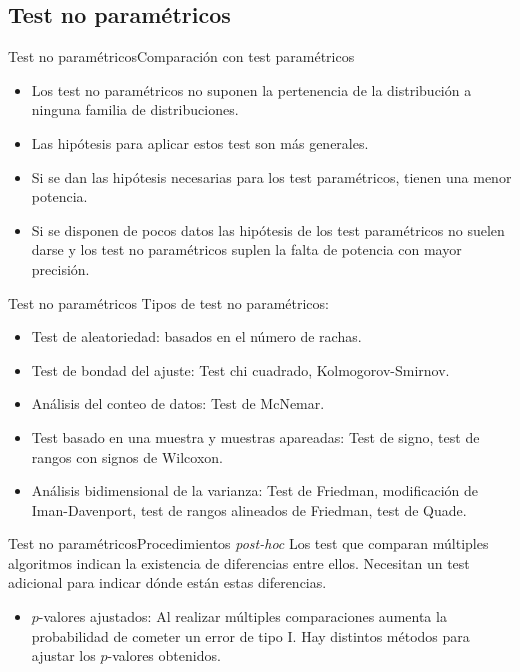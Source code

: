 \documentclass[leqno]{beamer}
\theoremstyle{definition_wo_parentheses}
\begin{document}
\subsection{Test no paramétricos}

\begin{frame}{Test no paramétricos}{Comparación con test paramétricos}
\begin{itemize}
\item Los test no paramétricos no suponen la pertenencia 
	de la distribución a ninguna familia de distribuciones.
\item Las hipótesis para aplicar estos test son más
	generales. 
\item Si se dan las hipótesis necesarias para los test
	paramétricos, tienen una menor potencia.
\item Si se disponen de pocos datos las hipótesis de los
	test paramétricos no suelen darse y los test no
	paramétricos suplen la falta de potencia con mayor
	precisión.
\end{itemize}		
\end{frame}

\begin{frame}{Test no paramétricos}
	Tipos de test no paramétricos:
\begin{itemize}
\item Test de aleatoriedad: basados en el número de rachas.
\item Test de bondad del ajuste: Test chi cuadrado, 
	Kolmogorov-Smirnov.
\item Análisis del conteo de datos: Test de McNemar.
\item Test basado en una muestra y muestras apareadas: Test
	de signo, test de rangos con signos de Wilcoxon. 
\item Análisis bidimensional de la varianza: Test de 
	Friedman, modificación de Iman-Davenport, test de 
	rangos alineados de Friedman, test de Quade.
\end{itemize}
\end{frame}

\begin{frame}{Test no paramétricos}{Procedimientos \textit{post-hoc}}
	Los test que comparan múltiples algoritmos indican la
existencia de diferencias entre ellos. Necesitan un
test adicional para indicar dónde están estas diferencias.

\begin{itemize}
\item $p$-valores ajustados: Al realizar múltiples comparaciones aumenta la probabilidad de cometer un error de tipo I. Hay distintos métodos para ajustar los $p$-valores obtenidos.
\end{itemize}
\end{frame}
\end{document}
